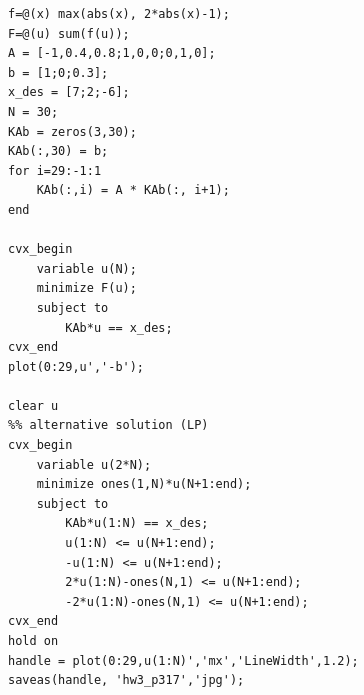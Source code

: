 \documentclass[12pt,a4paper]{article}
\begin{document}
\begin{verbatim}
f=@(x) max(abs(x), 2*abs(x)-1);
F=@(u) sum(f(u));
A = [-1,0.4,0.8;1,0,0;0,1,0];
b = [1;0;0.3];
x_des = [7;2;-6];
N = 30;
KAb = zeros(3,30);
KAb(:,30) = b;
for i=29:-1:1
    KAb(:,i) = A * KAb(:, i+1);
end

cvx_begin
    variable u(N);
    minimize F(u);
    subject to 
        KAb*u == x_des;
cvx_end
plot(0:29,u','-b');

clear u
%% alternative solution (LP)
cvx_begin
    variable u(2*N);
    minimize ones(1,N)*u(N+1:end);
    subject to
        KAb*u(1:N) == x_des;
        u(1:N) <= u(N+1:end);
        -u(1:N) <= u(N+1:end);
        2*u(1:N)-ones(N,1) <= u(N+1:end);
        -2*u(1:N)-ones(N,1) <= u(N+1:end);
cvx_end
hold on
handle = plot(0:29,u(1:N)','mx','LineWidth',1.2);
saveas(handle, 'hw3_p317','jpg');
\end{verbatim}
\end{document}

